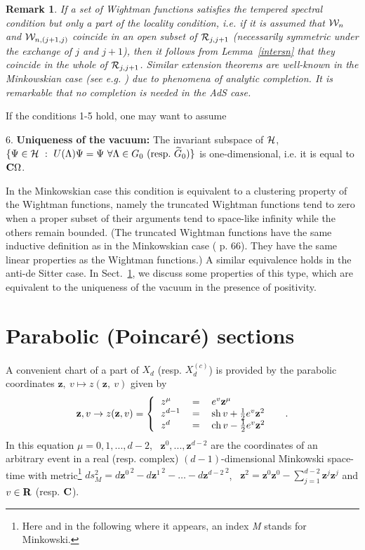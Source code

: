 \documentclass[a4paper,a4paper]{article}
\let\UnmodifSec=\section
\renewcommand{\section}{\setcounter{equation}{0}\UnmodifSec}
\newtheorem{remark}{Remark}[section]
\def\RR{\mathbb R}
\newcommand{\zz}{{\mathbf{z}}}
\def\bC{{\bf C}}
\def\bR{{\bf R}}
\def\ch{{\rm ch\,}}
\def\sh{{\rm sh\,}}
\def\HH{{\cal H}}
\def\RR{{\cal R}}
\def\WW{{\cal W}}
\def\wt{\widetilde}
\def\Xcd{X_d^{(c)}}
\begin{document}
\begin{remark}
\label{extloc}\rm
If a set of Wightman functions satisfies the tempered spectral condition
but only a part of the locality condition, i.e. if it is
assumed that $\WW_n$ and $\WW_{n,(j+1,j)}$ coincide in an open
subset of $\RR_{j,j+1}$
(necessarily symmetric under the exchange of $j$ and $j+1$),
then it follows from Lemma~\ref{intersn} that
they coincide in the whole of $\RR_{j,j+1}$. Similar extension theorems
are well-known in the Minkowskian case (see e.g. \cite{SW}) due
to phenomena of analytic completion. It is remarkable that no
completion is needed in the AdS case.
\end{remark}


If the conditions 1-5 hold, one may want to assume

\begin{description}
\item{6.} {\bf Uniqueness of the vacuum:}
The invariant subspace of $\HH$,
$\{\Psi \in \HH\ :\ U(\Lambda)\Psi = \Psi\ \forall \Lambda \in G_0
\ ({\rm resp.\ }\wt G_0)\}$
is one-dimensional, i.e. it is equal to $\bC\Omega$.
\end{description}

In the Minkowskian case this condition is equivalent to a clustering
property of the Wightman functions, namely the truncated
Wightman functions tend to zero when a proper subset of their
arguments tend to space-like infinity while the others remain bounded.
(The truncated Wightman functions have the same inductive definition
as in the Minkowskian case (\cite{J} p. 66). They have the same linear
properties as the Wightman functions.)
A similar equivalence holds in the anti-de Sitter case.
In Sect.~\ref{parsec}, we discuss some properties of this type,
which are equivalent to the uniqueness of the vacuum in the presence
of positivity.


\section{Parabolic (Poincar\'e) sections}

\label{parsec} A convenient chart of a part of $X_d$ (resp.
$\Xcd$) is provided by the parabolic coordinates $\zz,\ v \mapsto
z(\zz,\ v)$ given by
\begin{equation}
\zz,v \rightarrow z(\zz,v)= \left\{\begin{tabular}{lcll}
 $z^{\mu} $&=& $e^{ {v}} \zz^\mu  $ &  \cr
 $z^{d-1} $&=& $\sh  {v} + \frac 12 e^{ {v}} \zz^2 $  &
\cr
 $z^{d}$&=&$ \ch  {v} - \frac 12 e^{ {v}}\zz^2$ & \label{6.1}
\end{tabular}\right. .
\label{poinc}\end{equation} In this equation ${
\mu=0,1,...,d-2}$, \ $\zz^0,...,\zz^{d-2}$ are the coordinates of
an arbitrary event in a real (resp. complex) $(d-1)$-dimensional
Minkowski space-time with metric\footnote{Here and in the
following where it appears, an index {\em {\small M}} stands for
Minkowski.} $ds^2_{{M}}= d{\zz^0}^{\,2}- d{\zz^1}^{\,2} - \ldots
-d{\zz^{d-2}}^{\,2}$, \ $\zz^2 = \zz^0\zz^0 - \sum_{j=1}^{d-2}
\zz^j \zz^j$ and $v \in \bR$ (resp. $\bC$).
\end{document}
